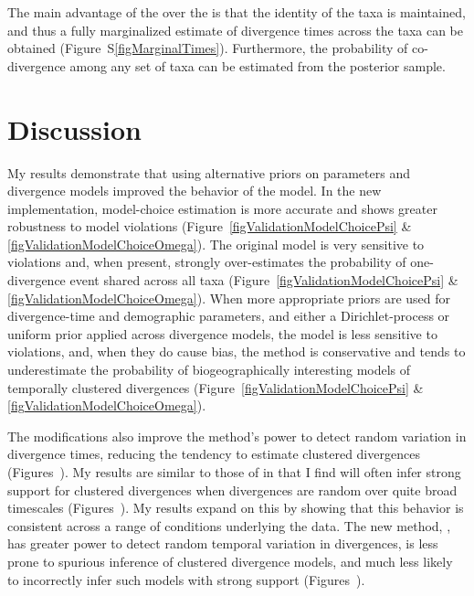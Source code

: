 The main advantage of the \npModelDPPOrdered over the \npModelDPP is that the
identity of the taxa is maintained, and thus a fully marginalized estimate of
divergence times across the taxa can be obtained
(Figure~S\ref{figMarginalTimes}).
Furthermore, the probability of co-divergence among any set of taxa can be
estimated from the posterior sample.

\section{Discussion}
My results demonstrate that using alternative priors on parameters and
divergence models improved the behavior of the \msb model.
In the new implementation, model-choice estimation is more accurate and shows
greater robustness to model violations
(Figure~\ref{figValidationModelChoicePsi} \&
\ref{figValidationModelChoiceOmega}).
The original model is very sensitive to violations and, when present,
strongly over-estimates the probability of one-divergence event shared
across all taxa
(Figure~\ref{figValidationModelChoicePsi} \&
\ref{figValidationModelChoiceOmega}).
When more appropriate priors are used for divergence-time and demographic
parameters, and either a Dirichlet-process or uniform prior applied across
divergence models, the model is less sensitive to violations, and, when they do
cause bias, the method is conservative and tends to underestimate the
probability of biogeographically interesting models of temporally clustered
divergences (Figure~\ref{figValidationModelChoicePsi} \&
\ref{figValidationModelChoiceOmega}).

The modifications also improve the method's power to detect random
variation in divergence times, reducing the tendency to estimate clustered
divergences
(Figures~).
My results are similar to those of \cite{Oaks2012} in that I find
\msb will often infer strong support for clustered divergences when
divergences are random over quite broad timescales
(Figures~).
My results expand on this by showing that this behavior is consistent
across a range of conditions underlying the data.
The new method, \dppmsbayes, has greater power to detect random temporal
variation in divergences, is less prone to spurious inference of clustered
divergence models, and much less likely to incorrectly infer such models with
strong support
(Figures~).

